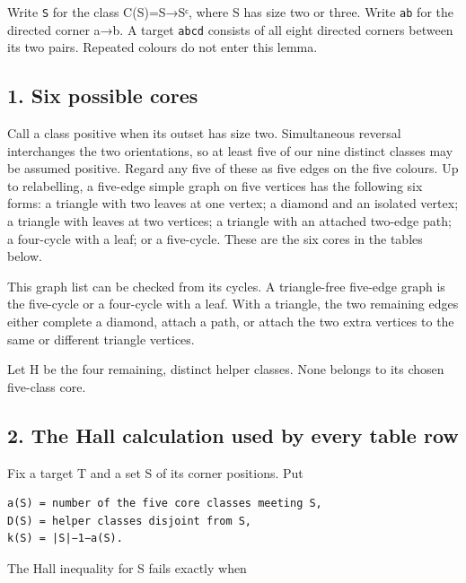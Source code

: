 \documentclass[
  10pt,
]{article}
\begin{document}
Write \texttt{S} for the class C(S)=S→Sᶜ, where S has size two or three.
Write \texttt{ab} for the directed corner a→b. A target
\texttt{ab\textbar{}cd} consists of all eight directed corners between
its two pairs. Repeated colours do not enter this lemma.

\hypertarget{six-possible-cores}{%
\subsection*{1. Six possible cores}\label{six-possible-cores}}

Call a class positive when its outset has size two. Simultaneous
reversal interchanges the two orientations, so at least five of our nine
distinct classes may be assumed positive. Regard any five of these as
five edges on the five colours. Up to relabelling, a five-edge simple
graph on five vertices has the following six forms: a triangle with two
leaves at one vertex; a diamond and an isolated vertex; a triangle with
leaves at two vertices; a triangle with an attached two-edge path; a
four-cycle with a leaf; or a five-cycle. These are the six cores in the
tables below.

This graph list can be checked from its cycles. A triangle-free
five-edge graph is the five-cycle or a four-cycle with a leaf. With a
triangle, the two remaining edges either complete a diamond, attach a
path, or attach the two extra vertices to the same or different triangle
vertices.

Let H be the four remaining, distinct helper classes. None belongs to
its chosen five-class core.

\hypertarget{the-hall-calculation-used-by-every-table-row}{%
\subsection*{2. The Hall calculation used by every table
row}\label{the-hall-calculation-used-by-every-table-row}}

Fix a target T and a set S of its corner positions. Put

\begin{verbatim}
a(S) = number of the five core classes meeting S,
D(S) = helper classes disjoint from S,
k(S) = |S|−1−a(S).
\end{verbatim}

The Hall inequality for S fails exactly when
\end{document}

